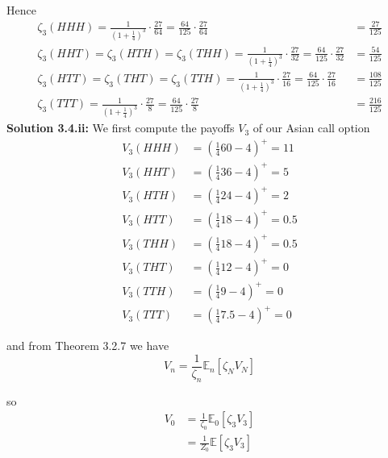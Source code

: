 \documentclass[12pt]{article}
\newcommand{\E}{\mathbb E}
\begin{document}
Hence
\begin{align*}
	\zeta_3(HHH) = \frac{1}{ \left( 1 + \frac{1}{4} \right)^3 } \cdot \frac{27}{64} = \frac{64}{125} \cdot \frac{27}{64} &= \frac{27}{125} \\
	\zeta_3(HHT) = \zeta_3(HTH) = \zeta_3(THH) = \frac{1}{ \left( 1 + \frac{1}{4} \right)^3 } \cdot \frac{27}{32} = \frac{64}{125} \cdot \frac{27}{32} &= \frac{54}{125} \\
	\zeta_3(HTT) = \zeta_3(THT) = \zeta_3(TTH) = \frac{1}{ \left( 1 + \frac{1}{4} \right)^3 } \cdot \frac{27}{16} = \frac{64}{125} \cdot \frac{27}{16} &= \frac{108}{125} \\
	\zeta_3(TTT) = \frac{1}{ \left( 1 + \frac{1}{4} \right)^3 } \cdot \frac{27}{8} = \frac{64}{125} \cdot \frac{27}{8} &= \frac{216}{125}
\end{align*}
{\bf Solution 3.4.ii:} We first compute the payoffs $V_3$ of our Asian call option
\begin{align*}
	V_3(HHH) &= \left(\frac{1}{4} 60 - 4\right)^+ = 11 \\
	V_3(HHT) &= \left(\frac{1}{4} 36 - 4\right)^+ = 5 \\
	V_3(HTH) &= \left(\frac{1}{4} 24 - 4\right)^+ = 2 \\
	V_3(HTT) &= \left(\frac{1}{4} 18 - 4\right)^+ = 0.5 \\
	V_3(THH) &= \left(\frac{1}{4} 18 - 4\right)^+ = 0.5 \\
	V_3(THT) &= \left(\frac{1}{4} 12 - 4\right)^+ = 0 \\
	V_3(TTH) &= \left(\frac{1}{4} 9 - 4\right)^+ = 0 \\
	V_3(TTT) &= \left(\frac{1}{4} 7.5 - 4\right)^+ = 0
\end{align*}

and from Theorem 3.2.7 we have
\begin{equation*}
	V_n = \frac{1}{\zeta_n} \E_n [\zeta_NV_N]
\end{equation*}

so
\begin{align*}
	V_0 &= \frac{1}{\zeta_0} \E_0[\zeta_3V_3] \\
	&= \frac{1}{Z_0} \E[\zeta_3V_3]
\end{align*}
\end{document}
